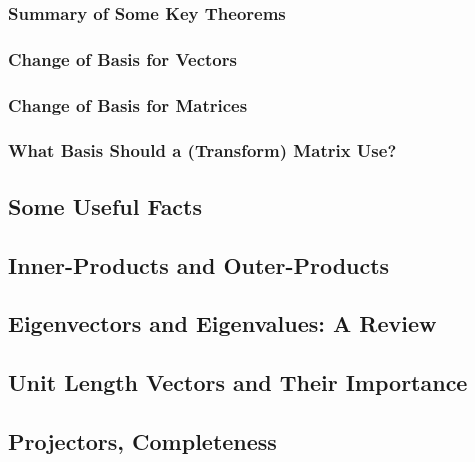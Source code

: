 \documentclass[main.tex]{subfiles}
\begin{document}
    \subsubsection{Summary of Some Key Theorems}
    
    \subsubsection{Change of Basis for Vectors}
    
    \subsubsection{Change of Basis for Matrices}
    
    \subsubsection{What Basis Should a (Transform) Matrix Use?}

\subsection{Some Useful Facts}

\subsection{Inner-Products and Outer-Products}

\subsection{Eigenvectors and Eigenvalues: A Review}

\subsection{Unit Length Vectors and Their Importance}

\subsection{Projectors, Completeness}
\end{document}
